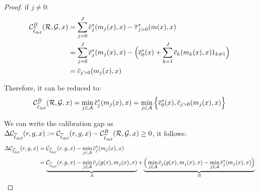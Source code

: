 \begin{appendices}
\begin{proof}
if $j\not=0$:
\begin{equation}
    \begin{aligned}
        \mathcal{C}_{\widetilde{\ell}_{\text{def}}}^B(\mathcal{R}, \mathcal{G},x) & = \sum_{j=0}^J\overline{c}_j^\ast(m_j(x),x) - \overline{\tau}_{j>0}^\ast(m(x),x) \\
        & =\sum_{j=0}^J\overline{c}_j^\ast(m_j(x),x) - \Big( \overline{c}_0^\ast(x) + \sum_{k=1}^J \overline{c}_k(m_k(x),x) 1_{k\not=1}\Big) \\
        & = \overline{c}_{j>0}(m_j(x),x)
    \end{aligned}
\end{equation}

Therefore, it can be reduced to:
\begin{equation}
    \mathcal{C}_{\widetilde{\ell}_{\text{def}}}^B(\mathcal{R}, \mathcal{G},x) = \min_{j\in\mathcal{A}}\overline{c}_j^\ast(m_j(x),x) = \min_{j\in\mathcal{A}}\Big\{ \overline{c}_0^\ast(x), \overline{c}_{j>0}(m_j(x),x)\Big\}
\end{equation}

We can write the calibration gap as $\Delta\mathcal{C}_{\widetilde{\ell}_{\text{def}}}(r,g,x):= \mathcal{C}_{\widetilde{\ell}_{\text{def}}}(r,g,x) - \mathcal{C}_{\widetilde{\ell}_{\text{def}}}^B(\mathcal{R}, \mathcal{G},x)\geq0$, it follows:
\begin{equation}\label{eq:AB}
    \begin{aligned}
        \Delta\mathcal{C}_{\widetilde{\ell}_{\text{def}}}(r,g,x) & = \mathcal{C}_{\widetilde{\ell}_{\text{def}}}(r,g,x) - \min_{j\in\mathcal{A}}\overline{c}_j^\ast(m_j(x),x) \\
        & = \underbrace{\mathcal{C}_{\widetilde{\ell}_{\text{def}}}(r,g,x) - \min_{j\in\mathcal{A}}\overline{c}_j(g(x), m_j(x),x)}_{A}  + \underbrace{\Big(\min_{j\in\mathcal{A}}\overline{c}_j(g(x), m_j(x),x) - \min_{j\in\mathcal{A}}\overline{c}_j^\ast(m_j(x),x) \Big)}_{B}
    \end{aligned}
\end{equation}


\end{proof}
\end{appendices}
